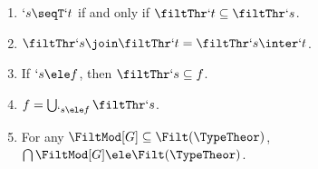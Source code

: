 \documentclass{CSML}
\begin{document}
 \begin{fact} \label{filter lemma}\hfill
 \begin{enumerate}

 \item \label{filter lemma leq} 
$`s\seqT `t$ if and only if $\filtThr`t \subseteq \filtThr`s$.

 \item \label{filter lemma join-meet} 
 $\filtThr `s \join \filtThr`t = \filtThr`s\inter`t$.

 \item \label{filter lemma ele} 
If $`s \ele f$, then $\filtThr `s \subseteq f$.

 \item \label{filter lemma filtersup}
$f = \bigcup_{`s \ele f} \filtThr `s $.

 \item \label{filter lemma arbitraryInter}
For any ${\FiltMod[G]}\subseteq \Filt(\TypeTheor)$, $\bigcap{\FiltMod[G]} \ele \Filt(\TypeTheor)$.

 \end{enumerate}
 \end{fact}
\end{document}

